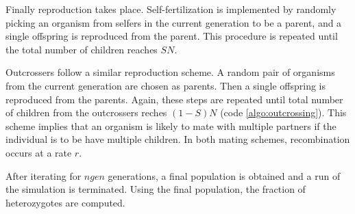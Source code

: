 \documentclass[12pt]{article}
\begin{document}
Finally reproduction takes place.
Self-fertilization is implemented by randomly picking an organism from
selfers in the current generation to be a parent, and a single
offspring is reproduced from the parent.
This procedure is repeated until the total number of children reaches
\(S N\).

Outcrossers follow a similar reproduction scheme.
A random pair of organisms from the current generation are chosen as
parents.
Then a single offspring is reproduced from the parents.
Again, these steps are repeated until total number of children from
the outcrossers reches \((1 - S)N\) (code \ref{algo:outcrossing}).
This scheme implies that an organism is likely to mate with multiple
partners if the individual is to be have multiple children.
In both mating schemes, recombination occurs at a rate \(r\).

After iterating for \(ngen\) generations, a final population is
obtained and a run of the simulation is terminated.
Using the final population, the fraction of heterozygotes are computed.
\end{document}
